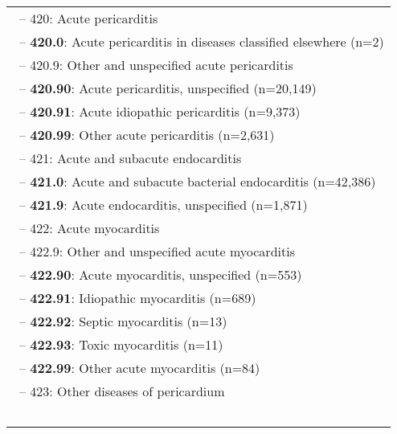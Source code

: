 \begin{longtable}{p{\textwidth}}
\\ \-\ \hspace{20pt}\footnotesize{-- 420: Acute pericarditis} \\ \-\ \hspace{30pt}\footnotesize{-- {\color{ForestGreen} \textbf{420.0}}: Acute pericarditis in diseases classified elsewhere (n=2)} \\ \-\ \hspace{30pt}\footnotesize{-- 420.9: Other and unspecified acute pericarditis} \\ \-\ \hspace{40pt}\footnotesize{-- {\color{ForestGreen} \textbf{420.90}}: Acute pericarditis, unspecified (n=20,149)} \\ \-\ \hspace{40pt}\footnotesize{-- {\color{ForestGreen} \textbf{420.91}}: Acute idiopathic pericarditis (n=9,373)} \\ \-\ \hspace{40pt}\footnotesize{-- {\color{ForestGreen} \textbf{420.99}}: Other acute pericarditis (n=2,631)} \\ \-\ \hspace{20pt}\footnotesize{-- 421: Acute and subacute endocarditis} \\ \-\ \hspace{30pt}\footnotesize{-- {\color{ForestGreen} \textbf{421.0}}: Acute and subacute bacterial endocarditis (n=42,386)} \\ \-\ \hspace{30pt}\footnotesize{-- {\color{ForestGreen} \textbf{421.9}}: Acute endocarditis, unspecified (n=1,871)} \\ \-\ \hspace{20pt}\footnotesize{-- 422: Acute myocarditis} \\ \-\ \hspace{30pt}\footnotesize{-- 422.9: Other and unspecified acute myocarditis} \\ \-\ \hspace{40pt}\footnotesize{-- {\color{ForestGreen} \textbf{422.90}}: Acute myocarditis, unspecified (n=553)} \\ \-\ \hspace{40pt}\footnotesize{-- {\color{ForestGreen} \textbf{422.91}}: Idiopathic myocarditis (n=689)} \\ \-\ \hspace{40pt}\footnotesize{-- {\color{ForestGreen} \textbf{422.92}}: Septic myocarditis (n=13)} \\ \-\ \hspace{40pt}\footnotesize{-- {\color{ForestGreen} \textbf{422.93}}: Toxic myocarditis (n=11)} \\ \-\ \hspace{40pt}\footnotesize{-- {\color{ForestGreen} \textbf{422.99}}: Other acute myocarditis (n=84)} \\ \-\ \hspace{20pt}\footnotesize{-- 423: Other diseases of pericardium} \\ \-\ \hspace{30pt}\footnotesize{-- {\color{ForestGreen} \textbf{423.0}}: 
\end{longtable}
